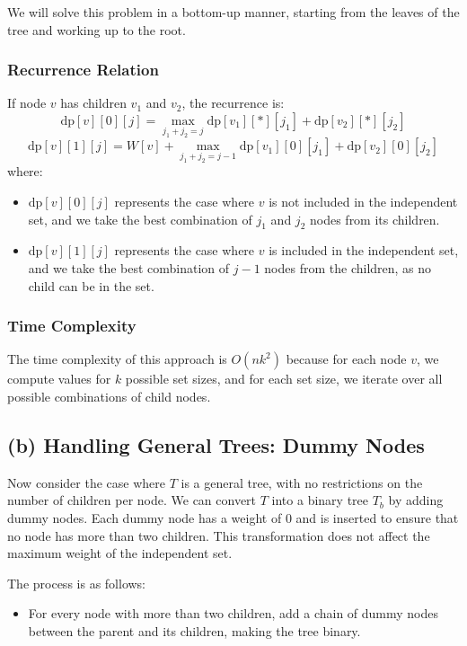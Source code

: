 \documentclass[11pt]{article}
\begin{document}
We will solve this problem in a bottom-up manner, starting from the leaves of the tree and working up to the root.

\subsubsection*{Recurrence Relation}

If node \( v \) has children \( v_1 \) and \( v_2 \), the recurrence is:
\[
\text{dp}[v][0][j] = \max_{j_1 + j_2 = j} \text{dp}[v_1][*][j_1] + \text{dp}[v_2][*][j_2]
\]
\[
\text{dp}[v][1][j] = W[v] + \max_{j_1 + j_2 = j-1} \text{dp}[v_1][0][j_1] + \text{dp}[v_2][0][j_2]
\]
where:
\begin{itemize}
    \item \( \text{dp}[v][0][j] \) represents the case where \( v \) is not included in the independent set, and we take the best combination of \( j_1 \) and \( j_2 \) nodes from its children.
    \item \( \text{dp}[v][1][j] \) represents the case where \( v \) is included in the independent set, and we take the best combination of \( j-1 \) nodes from the children, as no child can be in the set.
\end{itemize}

\subsubsection*{Time Complexity}

The time complexity of this approach is \( O(nk^2) \) because for each node \( v \), we compute values for \( k \) possible set sizes, and for each set size, we iterate over all possible combinations of child nodes.

\subsection*{(b) Handling General Trees: Dummy Nodes}

Now consider the case where \( T \) is a general tree, with no restrictions on the number of children per node. We can convert \( T \) into a binary tree \( T_b \) by adding dummy nodes. Each dummy node has a weight of 0 and is inserted to ensure that no node has more than two children. This transformation does not affect the maximum weight of the independent set.

The process is as follows:
\begin{itemize}
    \item For every node with more than two children, add a chain of dummy nodes between the parent and its children, making the tree binary.
\end{itemize}
\end{document}
